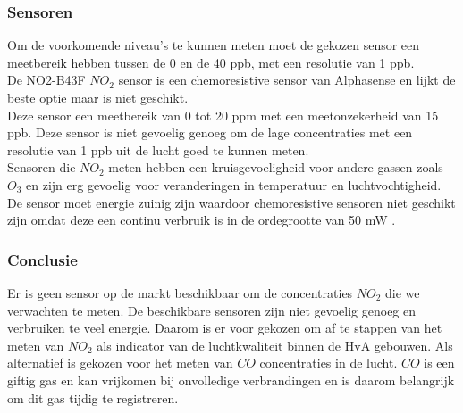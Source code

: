 \documentclass[a4paper, 11pt]{article} %
\begin{document}
\subsubsection{Sensoren}
Om de voorkomende niveau's te kunnen meten moet de gekozen sensor een meetbereik hebben tussen de 0 en de 40 ppb, met een resolutie van 1 ppb.\\
De NO2-B43F $NO_2$ sensor is een chemoresistive sensor van Alphasense en lijkt de beste optie maar is niet geschikt.\\
Deze sensor een meetbereik van 0 tot 20 ppm met een meetonzekerheid van 15 ppb. Deze sensor is niet gevoelig genoeg om de lage concentraties met een resolutie van 1 ppb uit de lucht goed te kunnen meten.\\ 
Sensoren die $NO_2$ meten hebben een kruisgevoeligheid voor andere gassen zoals $O_3$ en zijn erg gevoelig voor veranderingen in temperatuur en luchtvochtigheid. \\
De sensor moet energie zuinig zijn waardoor chemoresistive sensoren niet geschikt zijn omdat deze een continu verbruik is in de ordegrootte van 50 mW \cite{B4DF}. 

\subsubsection{Conclusie}
Er is geen sensor op de markt beschikbaar om de concentraties $NO_2$ die we verwachten te meten. De beschikbare sensoren zijn niet gevoelig genoeg en verbruiken te veel energie. Daarom is er voor gekozen om af te stappen van het meten van $NO_2$ als indicator van de luchtkwaliteit binnen de HvA gebouwen. Als alternatief is gekozen voor het meten van $CO$ concentraties in de lucht. $CO$ is een giftig gas en kan vrijkomen bij onvolledige verbrandingen en is daarom belangrijk om dit gas tijdig te registreren.

\end{document}
